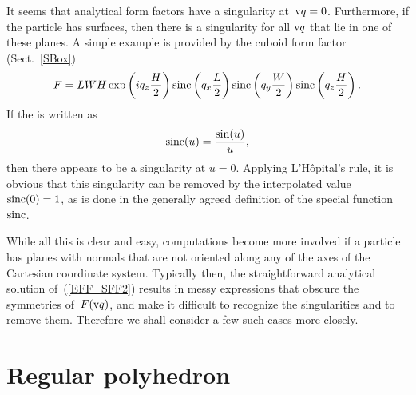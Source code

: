 %
It seems that  analytical form factors have a singularity at~$\text{v}{q}=0$.
Furthermore, if the particle has  surfaces,
then there is a singularity for all $\text{v}{q}$ that lie in one of these planes.
A simple example is provided by the cuboid form factor (Sect.~\ref{SBox})
\begin{equation}
F= L W H\exp\left(i q_z \frac{H}{2}\right) \operatorname{sinc}\left(q_x \frac{L}{2}\right)
\operatorname{sinc}\left(q_y \frac{W}{2}\right) \operatorname{sinc}\left(q_z \frac{H}{2}\right).
\end{equation}
If the  is written as
\begin{equation}
  \operatorname{sinc}(u) = \frac{\sin(u)}{u},
\end{equation}
then there appears to be a singularity at $u=0$.
Applying L'Hôpital's rule, it is obvious
that this singularity can be removed by the interpolated value
$\operatorname{sinc}(0)=1$,
as is done in the generally agreed definition of the special function~$\operatorname{sinc}$.

While all this is clear and easy,
computations become more involved
if a particle has planes with normals that are not oriented along
any of the axes of the Cartesian coordinate system.
Typically then, the straightforward analytical solution of~(\ref{EFF_SFF2})
results in messy expressions that obscure the symmetries of~$F(\text{v}{q})$,
and make it difficult to recognize the singularities and
to remove them.
Therefore we shall consider a few such cases more closely.


\section{Regular polyhedron}

